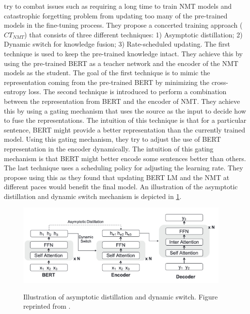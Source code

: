  try to combat issues such as requiring a long time to train NMT models and catastrophic forgetting problem from updating too many of the pre-trained models in the fine-tuning process. They propose a concerted training approach ($CT_{NMT}$) that consists of three different techniques: 1) Asymptotic distillation; 2) Dynamic switch for knowledge fusion; 3) Rate-scheduled updating. The first technique is used to keep the pre-trained knowledge intact. They achieve this by using the pre-trained BERT as a teacher network and the encoder of the NMT models as the student. The goal of the first technique is to mimic the representation coming from the pre-trained BERT by minimizing the cross-entropy loss. The second technique is introduced to perform a combination between the representation from BERT and the encoder of NMT. They achieve this by using a gating mechanism that uses the source as the input to decide how to fuse the representations. The intuition of this technique is that for a particular sentence, BERT might provide a better representation than the currently trained model. Using this gating mechanism, they try to adjust the use of BERT representation in the encoder dynamically. The intuition of this gating mechanism is that BERT might better encode some sentences better than others. The last technique uses a scheduling policy for adjusting the learning rate. They propose using this as they found that updating BERT LM and the NMT at different paces would benefit the final model. An illustration of the asymptotic distillation and dynamic switch mechanism is depicted in \cref{img:ctnmt}.

\begin{figure}[h]
    {\includegraphics[width=0.95\textwidth]{img/ctnmt.png}}
    \centering
    \caption{Illustration of asymptotic distillation and dynamic switch. Figure reprinted from .}
    \label{img:ctnmt}
\end{figure}

